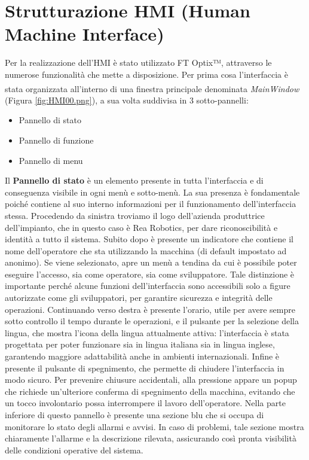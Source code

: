 \section{Strutturazione HMI (Human Machine Interface)}
Per la realizzazione dell'HMI è stato utilizzato FT Optix™, attraverso le numerose funzionalità che mette a disposizione. Per prima cosa l'interfaccia è stata organizzata all'interno di una finestra principale denominata \textit{MainWindow}\textsuperscript{\cite{rockwelloptixmainwindow}} (Figura \ref{fig:HMI00.png}), a sua volta suddivisa in 3 sotto-pannelli:
\begin{itemize}
    \item Pannello di stato
    \item Pannello di funzione
    \item Pannello di menu
\end{itemize}
Il \textbf{Pannello di stato} è un elemento presente in tutta l'interfaccia e di conseguenza visibile in ogni menù e sotto-menù. La sua presenza è fondamentale poiché contiene al suo interno informazioni per il funzionamento dell'interfaccia stessa. Procedendo da sinistra troviamo il logo dell'azienda produttrice dell'impianto, che in questo caso è Rea Robotics, per dare riconoscibilità e identità a tutto il sistema. Subito dopo è presente un indicatore che contiene il nome dell'operatore che sta utilizzando la macchina (di default impostato ad anonimo). Se viene selezionato, apre un menù a tendina da cui è possibile poter eseguire l'accesso, sia come operatore, sia come sviluppatore. Tale distinzione è importante perché alcune funzioni dell'interfaccia sono accessibili solo a figure autorizzate come gli sviluppatori, per garantire sicurezza e integrità delle operazioni. 
Continuando verso destra è presente l'orario, utile per avere sempre sotto controllo il tempo durante le operazioni, e il pulsante per la selezione della lingua, che mostra l'icona della lingua attualmente attiva: l'interfaccia è stata progettata per poter funzionare sia in lingua italiana sia in lingua inglese, garantendo maggiore adattabilità anche in ambienti internazionali. Infine è presente il pulsante di spegnimento, che permette di chiudere l'interfaccia in modo sicuro. Per prevenire chiusure accidentali, alla pressione appare un popup che richiede un'ulteriore conferma di spegnimento della macchina, evitando che un tocco involontario possa interrompere il lavoro dell'operatore.
Nella parte inferiore di questo pannello è presente una sezione blu che si occupa di monitorare lo stato degli allarmi e avvisi. In caso di problemi, tale sezione mostra chiaramente l'allarme e la descrizione rilevata, assicurando così pronta visibilità delle condizioni operative del sistema.

